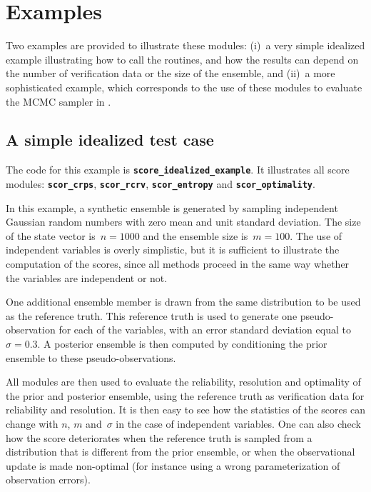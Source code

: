 \documentclass[11pt]{article}
\begin{document}
\clearpage

\section{Examples}

Two examples are provided to illustrate these modules:
(i)~a very simple idealized example illustrating how to call the routines,
and how the results can depend on the number of verification data or the size of the ensemble, and
(ii)~a more sophisticated example, which corresponds to the use of these modules
to evaluate the MCMC sampler in \citet{BRAN19}.

\subsection{A simple idealized test case}

The code for this example is {\tt\bf score\_idealized\_example}.
It illustrates all score modules: {\tt\bf scor\_crps}, {\tt\bf scor\_rcrv},
{\tt\bf scor\_entropy} and {\tt\bf scor\_optimality}.

In this example, a synthetic ensemble is generated
by sampling independent Gaussian random numbers
with zero mean and unit standard deviation.
The size of the state vector is~$n=1000$ and the ensemble size is~$m=100$.
The use of independent variables is overly simplistic,
but it is sufficient to illustrate the computation of the scores,
since all methods proceed in the same way
whether the variables are independent or not.

One additional ensemble member is drawn from the same distribution
to be used as the reference truth.
This reference truth is used to generate one pseudo-observation
for each of the variables, with an error standard deviation equal to~$\sigma=0.3$.
A posterior ensemble is then computed by conditioning the prior ensemble
to these pseudo-observations.

All modules are then used to evaluate the reliability, resolution
and optimality of the prior and posterior ensemble,
using the reference truth as verification data for reliability and resolution.
It is then easy to see how the statistics of the scores
can change with $n$, $m$ and~$\sigma$ in the case of independent variables.
One can also check how the score deteriorates
when the reference truth is sampled from a distribution
that is different from the prior ensemble, or
when the observational update is made non-optimal
(for instance using a wrong parameterization of observation errors).
\end{document}
